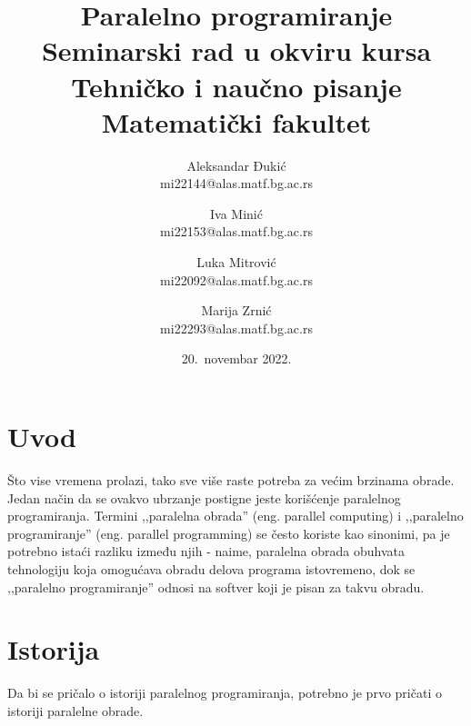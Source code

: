 \documentclass[a4paper]{article}
\begin{document}
	
	\title{Paralelno programiranje\\ \small{Seminarski rad u okviru kursa\\Tehničko i naučno pisanje\\ Matematički fakultet}}
	
	\author
	{
		Aleksandar Đukić\\mi22144@alas.matf.bg.ac.rs
		\and
		Iva Minić\\mi22153@alas.matf.bg.ac.rs
		\and
		Luka Mitrović\\mi22092@alas.matf.bg.ac.rs
		\and
		Marija Zrnić\\mi22293@alas.matf.bg.ac.rs
	}
	
	\date{20.~novembar 2022.}
	\maketitle
	
		\tableofcontents
		
	\newpage
	\section{Uvod}
	Što vise vremena prolazi, tako sve više raste potreba za većim brzinama obrade. Jedan način da se ovakvo ubrzanje postigne jeste korišćenje paralelnog programiranja. Termini ,,paralelna obrada'' (eng. parallel computing) i ,,paralelno programiranje'' (eng. parallel programming) se često koriste kao sinonimi, pa je potrebno istaći razliku između njih - naime, paralelna obrada obuhvata tehnologiju koja omogućava obradu delova programa istovremeno, dok se ,,paralelno programiranje'' odnosi na softver koji je pisan za takvu obradu.
	
	\section{Istorija}
	Da bi se pričalo o istoriji paralelnog programiranja, potrebno je prvo pričati o istoriji paralelne obrade.
\end{document}
